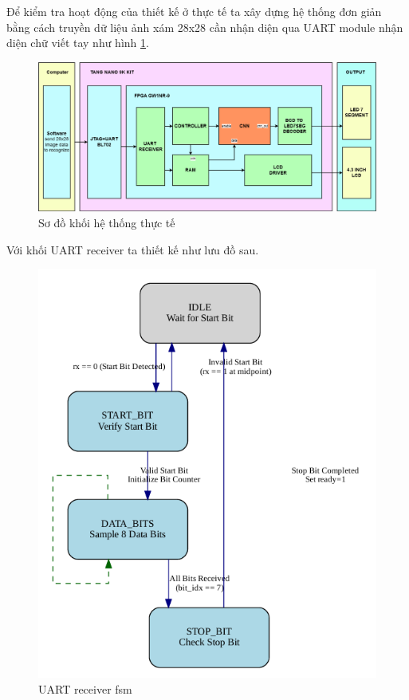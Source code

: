 Để kiểm tra hoạt động của thiết kế ở thực tế ta xây dựng hệ thống đơn giản bằng cách truyền dữ liệu ảnh xám 28x28 cần nhận diện qua UART module nhận diện chữ viết tay như hình \ref{fig:kit}.
\begin{figure}[H]
    \centering
    \includegraphics[width=1\linewidth]{Images/cnn_dut_mnist_test-Page-2.drawio.png}
    \caption{Sơ đồ khối hệ thống thực tế}
    \label{fig:kit}
\end{figure}

Với khối UART receiver ta thiết kế như lưu đồ sau.
\begin{figure}[H]
    \centering
    \includegraphics[width=0.5\linewidth]{Images/uartrx.png}
    \caption{UART receiver fsm}
    \label{fig:enter-label}
\end{figure}

